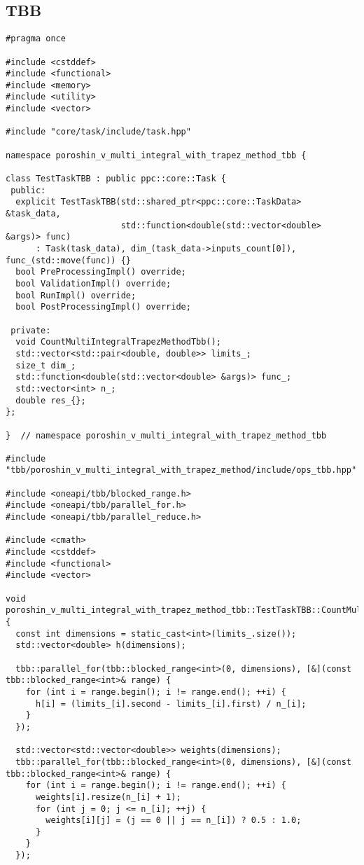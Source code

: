 \documentclass[12pt]{article}
\begin{document}
\subsection*{TBB}
\begin{lstlisting}
#pragma once

#include <cstddef>
#include <functional>
#include <memory>
#include <utility>
#include <vector>

#include "core/task/include/task.hpp"

namespace poroshin_v_multi_integral_with_trapez_method_tbb {

class TestTaskTBB : public ppc::core::Task {
 public:
  explicit TestTaskTBB(std::shared_ptr<ppc::core::TaskData> &task_data,
                       std::function<double(std::vector<double> &args)> func)
      : Task(task_data), dim_(task_data->inputs_count[0]), func_(std::move(func)) {}
  bool PreProcessingImpl() override;
  bool ValidationImpl() override;
  bool RunImpl() override;
  bool PostProcessingImpl() override;

 private:
  void CountMultiIntegralTrapezMethodTbb();
  std::vector<std::pair<double, double>> limits_;
  size_t dim_;
  std::function<double(std::vector<double> &args)> func_;
  std::vector<int> n_;
  double res_{};
};

}  // namespace poroshin_v_multi_integral_with_trapez_method_tbb

#include "tbb/poroshin_v_multi_integral_with_trapez_method/include/ops_tbb.hpp"

#include <oneapi/tbb/blocked_range.h>
#include <oneapi/tbb/parallel_for.h>
#include <oneapi/tbb/parallel_reduce.h>

#include <cmath>
#include <cstddef>
#include <functional>
#include <vector>

void poroshin_v_multi_integral_with_trapez_method_tbb::TestTaskTBB::CountMultiIntegralTrapezMethodTbb() {
  const int dimensions = static_cast<int>(limits_.size());
  std::vector<double> h(dimensions);

  tbb::parallel_for(tbb::blocked_range<int>(0, dimensions), [&](const tbb::blocked_range<int>& range) {
    for (int i = range.begin(); i != range.end(); ++i) {
      h[i] = (limits_[i].second - limits_[i].first) / n_[i];
    }
  });

  std::vector<std::vector<double>> weights(dimensions);
  tbb::parallel_for(tbb::blocked_range<int>(0, dimensions), [&](const tbb::blocked_range<int>& range) {
    for (int i = range.begin(); i != range.end(); ++i) {
      weights[i].resize(n_[i] + 1);
      for (int j = 0; j <= n_[i]; ++j) {
        weights[i][j] = (j == 0 || j == n_[i]) ? 0.5 : 1.0;
      }
    }
  });


\end{lstlisting}
\end{document}
